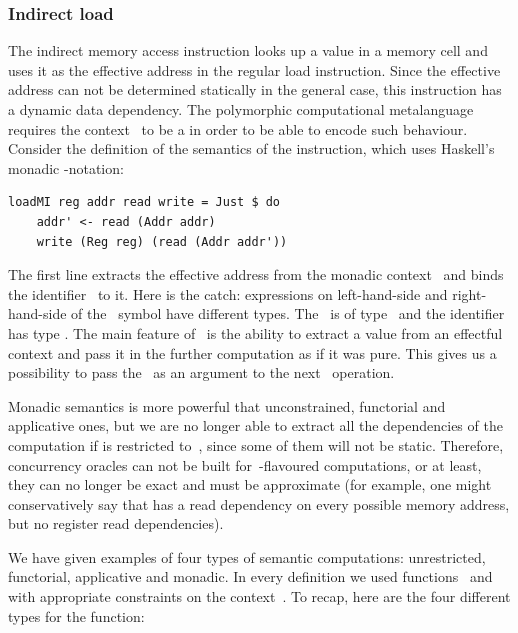 \subsubsection{Indirect load}

The indirect memory access instruction looks up a value in a memory cell and uses
it as the effective address in the regular load instruction. Since the effective
address can not be determined statically in the general case, this instruction
has a dynamic data dependency. The polymorphic computational metalanguage requires
the context~ to be a  in order to be able to encode such behaviour.
Consider the definition of the semantics of the  instruction, which
uses Haskell's monadic -notation:

\begin{verbatim}
loadMI reg addr read write = Just $ do
    addr' <- read (Addr addr)
    write (Reg reg) (read (Addr addr'))
\end{verbatim}

\noindent
The first line extracts the effective address from the monadic context~
and binds the identifier~ to it. Here is the catch: expressions
on left-hand-side and right-hand-side of the~\hs{<-} symbol have different types.
The~ is of type~ and the
identifier~ has type . The main feature of~ is the
ability to extract a value from an effectful context and pass it in the further
computation as if it was pure. This gives us a possibility to pass the~
as an argument to the next~ operation.

Monadic semantics is more powerful that unconstrained, functorial and applicative ones,
but we are no longer able to extract all the dependencies of the computation if
 is restricted to~, since some of them will not be static.
Therefore, concurrency oracles can not be built for~-flavoured
computations, or at least, they can no longer be exact and must be approximate
(for example, one might conservatively say that  has a read
dependency on every possible memory address, but no register read dependencies).

We have given examples of four types of semantic computations: unrestricted,
functorial, applicative and monadic. In every definition we used
functions~ and~ with appropriate constraints on the
context~. To recap, here are the four different types for the 
function:

